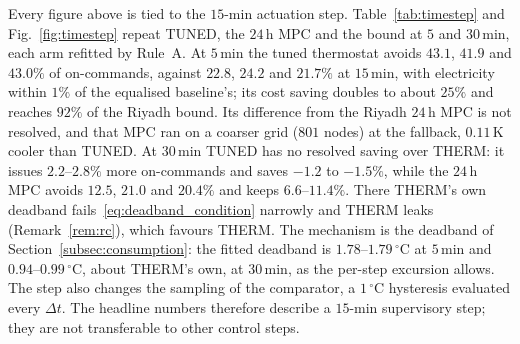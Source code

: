 \documentclass[pdflatex,sn-mathphys-num,iicol]{sn-jnl}
\theoremstyle{thmstyleone}\newtheorem{proposition}{Proposition}\newtheorem{corollary}{Corollary}
\theoremstyle{thmstyletwo}\newtheorem{remark}{Remark}\newtheorem{observation}{Observation}
\theoremstyle{thmstylethree}\newtheorem{definition}{Definition}
\begin{document}
Every figure above is tied to the $15$-min actuation step. Table~\ref{tab:timestep} and Fig.~\ref{fig:timestep} repeat TUNED, the $24\,$h MPC and the bound at $5$ and $30\,$min, each arm refitted by Rule~A. At $5\,$min the tuned thermostat avoids $43.1$, $41.9$ and $43.0\%$ of on-commands, against $22.8$, $24.2$ and $21.7\%$ at $15\,$min, with electricity within $1\%$ of the equalised baseline's; its cost saving doubles to about $25\%$ and reaches $92\%$ of the Riyadh bound. Its difference from the Riyadh $24\,$h MPC is not resolved, and that MPC ran on a coarser grid ($801$ nodes) at the fallback, $0.11\,$K cooler than TUNED. At $30\,$min TUNED has no resolved saving over THERM: it issues $2.2$--$2.8\%$ more on-commands and saves $-1.2$ to $-1.5\%$, while the $24\,$h MPC avoids $12.5$, $21.0$ and $20.4\%$ and keeps $6.6$--$11.4\%$. There THERM's own deadband fails~\eqref{eq:deadband_condition} narrowly and THERM leaks (Remark~\ref{rem:rc}), which favours THERM. The mechanism is the deadband of Section~\ref{subsec:consumption}: the fitted deadband is $1.78$--$1.79\,^\circ$C at $5\,$min and $0.94$--$0.99\,^\circ$C, about THERM's own, at $30\,$min, as the per-step excursion allows. The step also changes the sampling of the comparator, a $1\,^\circ$C hysteresis evaluated every $\Delta t$. The headline numbers therefore describe a $15$-min supervisory step; they are not transferable to other control steps.


\end{document}
